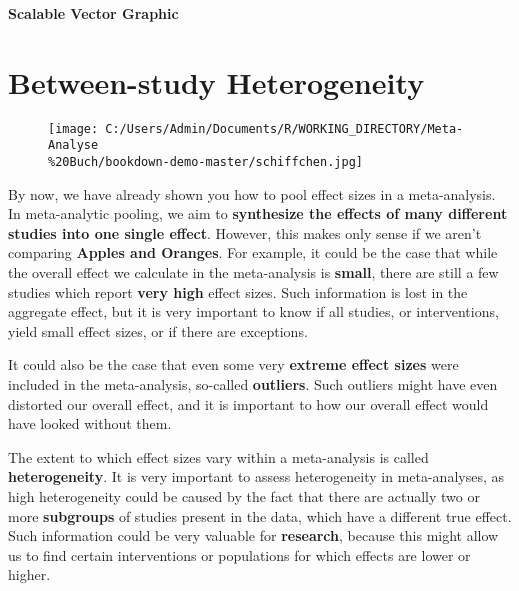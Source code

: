 \documentclass[]{book}
\newenvironment{Shaded}{\begin{snugshade}}{\end{snugshade}}
\newcommand{\KeywordTok}[1]{\textcolor[rgb]{0.13,0.29,0.53}{\textbf{#1}}}
\newcommand{\DataTypeTok}[1]{\textcolor[rgb]{0.13,0.29,0.53}{#1}}
\newcommand{\DecValTok}[1]{\textcolor[rgb]{0.00,0.00,0.81}{#1}}
\newcommand{\StringTok}[1]{\textcolor[rgb]{0.31,0.60,0.02}{#1}}
\newcommand{\NormalTok}[1]{#1}
\theoremstyle{definition}
\theoremstyle{definition}
\theoremstyle{definition}
\theoremstyle{remark}
\begin{document}
\textbf{Scalable Vector Graphic}

\begin{Shaded}
\end{Shaded}

\chapter{Between-study Heterogeneity}\label{between-study-heterogeneity}

\begin{figure}
\centering
\texttt{[image: C:/Users/Admin/Documents/R/WORKING\_DIRECTORY/Meta-Analyse\\\%20Buch/bookdown-demo-master/schiffchen.jpg]}
\caption{}
\end{figure}

By now, we have already shown you how to pool effect sizes in a
meta-analysis. In meta-analytic pooling, we aim to \textbf{synthesize
the effects of many different studies into one single effect}. However,
this makes only sense if we aren't comparing \textbf{Apples and
Oranges}. For example, it could be the case that while the overall
effect we calculate in the meta-analysis is \textbf{small}, there are
still a few studies which report \textbf{very high} effect sizes. Such
information is lost in the aggregate effect, but it is very important to
know if all studies, or interventions, yield small effect sizes, or if
there are exceptions.

It could also be the case that even some very \textbf{extreme effect
sizes} were included in the meta-analysis, so-called \textbf{outliers}.
Such outliers might have even distorted our overall effect, and it is
important to how our overall effect would have looked without them.

The extent to which effect sizes vary within a meta-analysis is called
\textbf{heterogeneity}. It is very important to assess heterogeneity in
meta-analyses, as high heterogeneity could be caused by the fact that
there are actually two or more \textbf{subgroups} of studies present in
the data, which have a different true effect. Such information could be
very valuable for \textbf{research}, because this might allow us to find
certain interventions or populations for which effects are lower or
higher.
\end{document}

